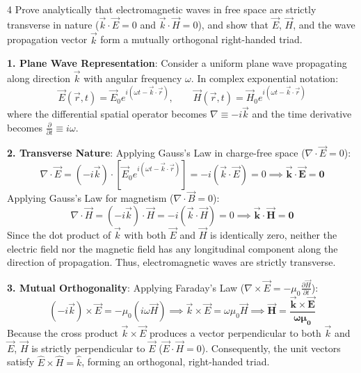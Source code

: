 \begin{theoryq}{4}
Prove analytically that electromagnetic waves in free space are strictly transverse in nature ($\vec{k} \cdot \vec{E} = 0$ and $\vec{k} \cdot \vec{H} = 0$), and show that $\vec{E}$, $\vec{H}$, and the wave propagation vector $\vec{k}$ form a mutually orthogonal right-handed triad.
\end{theoryq}
\begin{theorysol}
\textbf{1. Plane Wave Representation}:
Consider a uniform plane wave propagating along direction $\vec{k}$ with angular frequency $\omega$. In complex exponential notation:
\begin{equation}
\vec{E}(\vec{r},t) = \vec{E}_0 e^{i(\omega t - \vec{k}\cdot\vec{r})}, \qquad \vec{H}(\vec{r},t) = \vec{H}_0 e^{i(\omega t - \vec{k}\cdot\vec{r})}
\end{equation}
where the differential spatial operator becomes $\nabla \equiv -i\vec{k}$ and the time derivative becomes $\frac{\partial}{\partial t} \equiv i\omega$.

\textbf{2. Transverse Nature}:
Applying Gauss's Law in charge-free space ($\nabla \cdot \vec{E} = 0$):
\begin{equation}
\nabla \cdot \vec{E} = (-i\vec{k}) \cdot \left[ \vec{E}_0 e^{i(\omega t - \vec{k}\cdot\vec{r})} \right] = -i(\vec{k} \cdot \vec{E}) = 0 \implies \mathbf{\vec{k} \cdot \vec{E} = 0}
\end{equation}
Applying Gauss's Law for magnetism ($\nabla \cdot \vec{B} = 0$):
\begin{equation}
\nabla \cdot \vec{H} = (-i\vec{k}) \cdot \vec{H} = -i(\vec{k} \cdot \vec{H}) = 0 \implies \mathbf{\vec{k} \cdot \vec{H} = 0}
\end{equation}
Since the dot product of $\vec{k}$ with both $\vec{E}$ and $\vec{H}$ is identically zero, neither the electric field nor the magnetic field has any longitudinal component along the direction of propagation. Thus, electromagnetic waves are strictly transverse.

\textbf{3. Mutual Orthogonality}:
Applying Faraday's Law ($\nabla \times \vec{E} = -\mu_0 \frac{\partial \vec{H}}{\partial t}$):
\begin{equation}
(-i\vec{k}) \times \vec{E} = -\mu_0 (i\omega \vec{H}) \implies \vec{k} \times \vec{E} = \omega \mu_0 \vec{H} \implies \mathbf{\vec{H} = \frac{\vec{k} \times \vec{E}}{\omega \mu_0}}
\end{equation}
Because the cross product $\vec{k} \times \vec{E}$ produces a vector perpendicular to both $\vec{k}$ and $\vec{E}$, $\vec{H}$ is strictly perpendicular to $\vec{E}$ ($\vec{E} \cdot \vec{H} = 0$).
Consequently, the unit vectors satisfy $\hat{E} \times \hat{H} = \hat{k}$, forming an orthogonal, right-handed triad.
\end{theorysol}
\vspace{4mm}

